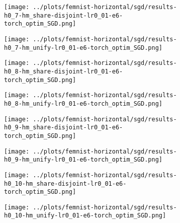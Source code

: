\begin{figure}[htbp]  %
    \centering
    \begin{subfigure}[b]{0.47\textwidth}
        \centering
        \texttt{[image: ../plots/femnist-horizontal/sgd/results-h0\_7-hm\_share-disjoint-lr0\_01-e6-torch\_optim\_SGD.png]}
    \end{subfigure}
    \hfill
    \begin{subfigure}[b]{0.47\textwidth}
        \centering
        \texttt{[image: ../plots/femnist-horizontal/sgd/results-h0\_7-hm\_unify-lr0\_01-e6-torch\_optim\_SGD.png]}
    \end{subfigure}
\end{figure}
\begin{figure}[htbp]  %
    \centering
    \begin{subfigure}[b]{0.47\textwidth}
        \centering
        \texttt{[image: ../plots/femnist-horizontal/sgd/results-h0\_8-hm\_share-disjoint-lr0\_01-e6-torch\_optim\_SGD.png]}
    \end{subfigure}
    \hfill
    \begin{subfigure}[b]{0.47\textwidth}
        \centering
        \texttt{[image: ../plots/femnist-horizontal/sgd/results-h0\_8-hm\_unify-lr0\_01-e6-torch\_optim\_SGD.png]}
    \end{subfigure}
\end{figure}
\begin{figure}[htbp]  %
    \centering
    \begin{subfigure}[b]{0.47\textwidth}
        \centering
        \texttt{[image: ../plots/femnist-horizontal/sgd/results-h0\_9-hm\_share-disjoint-lr0\_01-e6-torch\_optim\_SGD.png]}
    \end{subfigure}
    \hfill
    \begin{subfigure}[b]{0.47\textwidth}
        \centering
        \texttt{[image: ../plots/femnist-horizontal/sgd/results-h0\_9-hm\_unify-lr0\_01-e6-torch\_optim\_SGD.png]}
    \end{subfigure}
\end{figure}
\begin{figure}[htbp]  %
    \centering
    \begin{subfigure}[b]{0.47\textwidth}
        \centering
        \texttt{[image: ../plots/femnist-horizontal/sgd/results-h0\_10-hm\_share-disjoint-lr0\_01-e6-torch\_optim\_SGD.png]}
    \end{subfigure}
    \hfill
    \begin{subfigure}[b]{0.47\textwidth}
        \centering
        \texttt{[image: ../plots/femnist-horizontal/sgd/results-h0\_10-hm\_unify-lr0\_01-e6-torch\_optim\_SGD.png]}
    \end{subfigure}
\end{figure}


